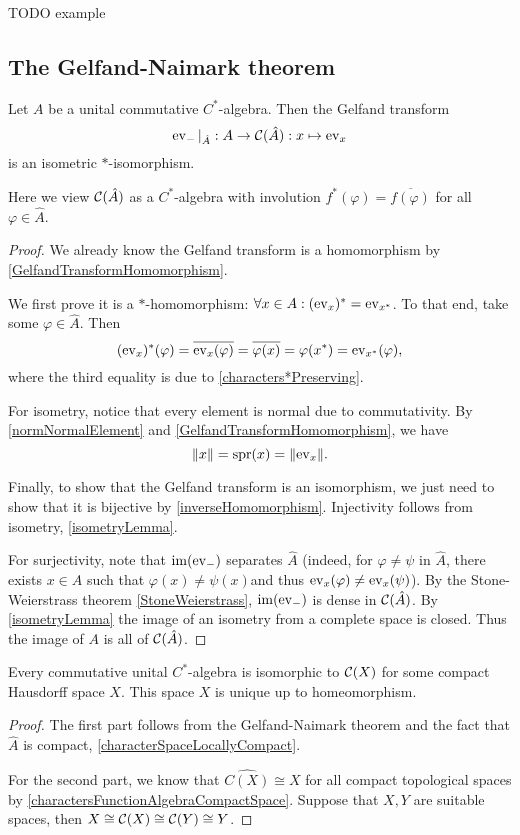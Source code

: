 TODO example


\subsection{The Gelfand-Naimark theorem}
\begin{theorem} \label{GelfandNaimarkCommutative}
Let $A$ be a unital commutative $C^*$-algebra. Then the Gelfand transform
\[ \operatorname{ev}_{-}|_{\hat{A}}: A\to\operatorname{\mathcal{C}}(\hat{A}): x\mapsto \operatorname{ev}_{x} \]
is an isometric $*$-isomorphism.
\end{theorem}
Here we view $\operatorname{\mathcal{C}}(\hat{A})$ as a $C^*$-algebra with involution $f^*(\varphi) = \overline{f(\varphi)}$ for all $\varphi\in\hat{A}$.
\begin{proof}
We already know the Gelfand transform is a homomorphism by \ref{GelfandTransformHomomorphism}.

We first prove it is a $*$-homomorphism: $\forall x\in A: (\operatorname{ev}_{x})^* = \operatorname{ev}_{x^*}$. To that end, take some $\varphi\in\hat{A}$. Then
\[ (\operatorname{ev}_{x})^*(\varphi) = \overline{\operatorname{ev}_{x}(\varphi)} = \overline{\varphi(x)} = \varphi(x^*) = \operatorname{ev}_{x^*}(\varphi), \]
where the third equality is due to \ref{characters*Preserving}.

For isometry, notice that every element is normal due to commutativity. By \ref{normNormalElement} and \ref{GelfandTransformHomomorphism}, we have
\[ \lVert x\rVert = \operatorname{spr}(x) = \lVert\operatorname{ev}_{x}\rVert. \]

Finally, to show that the Gelfand transform is an isomorphism, we just need to show that it is bijective by \ref{inverseHomomorphism}. Injectivity follows from isometry, \ref{isometryLemma}.

For surjectivity, note that $\operatorname{im}(\operatorname{ev}_{-})$ separates $\hat{A}$ (indeed, for $\varphi \neq \psi$ in $\hat{A}$, there exists $x\in A$ such that $\varphi(x) \neq \psi(x)$and thus $\operatorname{ev}_x(\varphi) \neq \operatorname{ev}_x(\psi)$).
By the Stone-Weierstrass theorem \ref{StoneWeierstrass}, $\operatorname{im}(\operatorname{ev}_{-})$ is dense in $\operatorname{\mathcal{C}}(\hat{A})$. By \ref{isometryLemma} the image of an isometry from a complete space is closed. Thus the image of $A$ is all of $\operatorname{\mathcal{C}}(\hat{A})$.
\end{proof}
\begin{corollary}
Every commutative unital $C^*$-algebra is isomorphic to $\operatorname{\mathcal{C}}(X)$ for some compact Hausdorff space $X$.
This space $X$ is unique up to homeomorphism.
\end{corollary}
\begin{proof}
The first part follows from the Gelfand-Naimark theorem and the fact that $\hat{A}$ is compact, \ref{characterSpaceLocallyCompact}.


For the second part, we know that $\widehat{C(X)}\cong X$ for all compact topological spaces by \ref{charactersFunctionAlgebraCompactSpace}. Suppose that $X,Y$ are suitable spaces, then $X \cong\operatorname{\mathcal{C}}(X) \cong \operatorname{\mathcal{C}}(Y)\cong Y$.
\end{proof}

